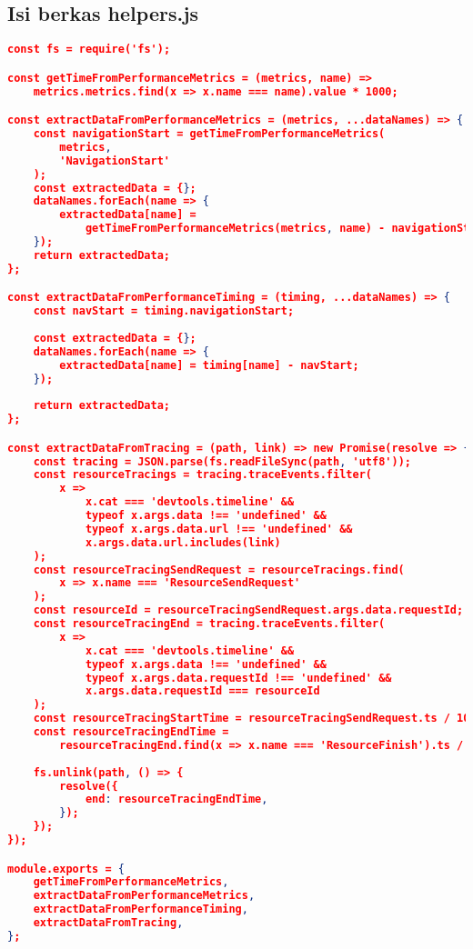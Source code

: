 	\subsection*{Isi berkas helpers.js}
\begin{lstlisting}[frame=single,tabsize=2,breaklines,caption={Isi berkas helpers.js},label=helperjs, captionpos=b, language=json]
const fs = require('fs');

const getTimeFromPerformanceMetrics = (metrics, name) =>
	metrics.metrics.find(x => x.name === name).value * 1000;

const extractDataFromPerformanceMetrics = (metrics, ...dataNames) => {
	const navigationStart = getTimeFromPerformanceMetrics(
		metrics,
		'NavigationStart'
	);
	const extractedData = {};
	dataNames.forEach(name => {
		extractedData[name] =
			getTimeFromPerformanceMetrics(metrics, name) - navigationStart;
	});
	return extractedData;
};

const extractDataFromPerformanceTiming = (timing, ...dataNames) => {
	const navStart = timing.navigationStart;
	
	const extractedData = {};
	dataNames.forEach(name => {
		extractedData[name] = timing[name] - navStart;
	});
	
	return extractedData;
};

const extractDataFromTracing = (path, link) => new Promise(resolve => {
	const tracing = JSON.parse(fs.readFileSync(path, 'utf8'));
	const resourceTracings = tracing.traceEvents.filter(
		x =>
			x.cat === 'devtools.timeline' &&
			typeof x.args.data !== 'undefined' &&
			typeof x.args.data.url !== 'undefined' &&
			x.args.data.url.includes(link)
	);
	const resourceTracingSendRequest = resourceTracings.find(
		x => x.name === 'ResourceSendRequest'
	);
	const resourceId = resourceTracingSendRequest.args.data.requestId;
	const resourceTracingEnd = tracing.traceEvents.filter(
		x =>
			x.cat === 'devtools.timeline' &&
			typeof x.args.data !== 'undefined' &&
			typeof x.args.data.requestId !== 'undefined' &&
			x.args.data.requestId === resourceId
	);
	const resourceTracingStartTime = resourceTracingSendRequest.ts / 1000;
	const resourceTracingEndTime =
		resourceTracingEnd.find(x => x.name === 'ResourceFinish').ts / 1000;
	
	fs.unlink(path, () => {
		resolve({
			end: resourceTracingEndTime,
		});
	});
});

module.exports = {
	getTimeFromPerformanceMetrics,
	extractDataFromPerformanceMetrics,
	extractDataFromPerformanceTiming,
	extractDataFromTracing,
};
\end{lstlisting}

